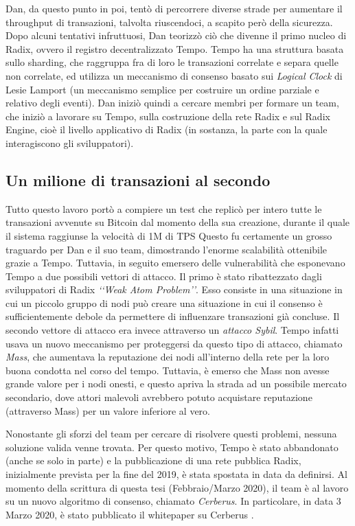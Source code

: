 Dan, da questo punto in poi, tentò di percorrere diverse strade per aumentare il throughput di transazioni, talvolta riuscendoci, a scapito però della sicurezza. Dopo alcuni tentativi infruttuosi, Dan teorizzò ciò che divenne il primo nucleo di Radix, ovvero il registro decentralizzato Tempo. Tempo ha una struttura basata sullo sharding, che raggruppa fra di loro le transazioni correlate e separa quelle non correlate, ed utilizza un meccanismo di consenso basato sui \textit{Logical Clock} di Lesie Lamport \cite{K9} (un meccanismo semplice per costruire un ordine parziale e relativo degli eventi). Dan iniziò quindi a cercare membri per formare un team, che iniziò a lavorare su Tempo, sulla costruzione della rete Radix e sul Radix Engine, cioè il livello applicativo di Radix (in sostanza, la parte con la quale interagiscono gli sviluppatori). 

\subsection{Un milione di transazioni al secondo}

Tutto questo lavoro portò a compiere un test che replicò per intero tutte le transazioni avvenute su Bitcoin dal momento della sua creazione, durante il quale il sistema raggiunse la velocità di 1M di TPS Questo fu certamente un grosso traguardo per Dan e il suo team, dimostrando l'enorme scalabilità ottenibile grazie a Tempo. Tuttavia, in seguito emersero delle vulnerabilità che esponevano Tempo a due possibili vettori di attacco. Il primo è stato ribattezzato dagli sviluppatori di Radix \textit{‘‘Weak Atom Problem’’}. Esso consiste in una situazione in cui un piccolo gruppo di nodi può creare una situazione in cui il consenso è sufficientemente debole da permettere di influenzare transazioni già concluse. Il secondo vettore di attacco era invece attraverso un \textit{attacco Sybil}. Tempo infatti usava un nuovo meccanismo per proteggersi da questo tipo di attacco, chiamato \textit{Mass}, che aumentava la reputazione dei nodi all'interno della rete per la loro buona condotta nel corso del tempo. Tuttavia, è emerso che Mass non avesse grande valore per i nodi onesti, e questo apriva la strada ad un possibile mercato secondario, dove attori malevoli avrebbero potuto acquistare reputazione  (attraverso Mass) per un valore inferiore al vero.

Nonostante gli sforzi del team per cercare di risolvere questi problemi, nessuna soluzione valida venne trovata. Per questo motivo, Tempo è stato abbandonato (anche se solo in parte) e la pubblicazione di una rete pubblica Radix, inizialmente prevista per la fine del 2019, è stata spostata in data da definirsi. Al momento della scrittura di questa tesi (Febbraio/Marzo 2020), il team è al lavoro su un nuovo algoritmo di consenso, chiamato \textit{Cerberus}. In particolare, in data 3 Marzo 2020, è stato pubblicato il whitepaper su Cerberus \cite{K10}. 

